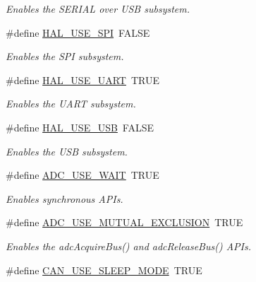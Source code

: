 \begin{DoxyCompactItemize}
\begin{DoxyCompactList}\small\item\em Enables the S\+E\+R\+I\+A\+L over U\+S\+B subsystem. \end{DoxyCompactList}\item 
\hypertarget{group__HAL__CONF_ga33a3c5bee9ed1f665aace8b88fed9b2b}{\#define \hyperlink{group__HAL__CONF_ga33a3c5bee9ed1f665aace8b88fed9b2b}{H\+A\+L\+\_\+\+U\+S\+E\+\_\+\+S\+P\+I}~F\+A\+L\+S\+E}\label{group__HAL__CONF_ga33a3c5bee9ed1f665aace8b88fed9b2b}

\begin{DoxyCompactList}\small\item\em Enables the S\+P\+I subsystem. \end{DoxyCompactList}\item 
\hypertarget{group__HAL__CONF_ga73220cad2edf2aee77b7ce1b53cacff0}{\#define \hyperlink{group__HAL__CONF_ga73220cad2edf2aee77b7ce1b53cacff0}{H\+A\+L\+\_\+\+U\+S\+E\+\_\+\+U\+A\+R\+T}~T\+R\+U\+E}\label{group__HAL__CONF_ga73220cad2edf2aee77b7ce1b53cacff0}

\begin{DoxyCompactList}\small\item\em Enables the U\+A\+R\+T subsystem. \end{DoxyCompactList}\item 
\hypertarget{group__HAL__CONF_gafc8f8fc6010f46f5baae4a369e14974e}{\#define \hyperlink{group__HAL__CONF_gafc8f8fc6010f46f5baae4a369e14974e}{H\+A\+L\+\_\+\+U\+S\+E\+\_\+\+U\+S\+B}~F\+A\+L\+S\+E}\label{group__HAL__CONF_gafc8f8fc6010f46f5baae4a369e14974e}

\begin{DoxyCompactList}\small\item\em Enables the U\+S\+B subsystem. \end{DoxyCompactList}\item 
\#define \hyperlink{group__HAL__CONF_ga39e892a4090185fbdda9bb105bc03b4f}{A\+D\+C\+\_\+\+U\+S\+E\+\_\+\+W\+A\+I\+T}~T\+R\+U\+E
\begin{DoxyCompactList}\small\item\em Enables synchronous A\+P\+Is. \end{DoxyCompactList}\item 
\#define \hyperlink{group__HAL__CONF_gac0893cb47e338c2dabad34b974a0a88d}{A\+D\+C\+\_\+\+U\+S\+E\+\_\+\+M\+U\+T\+U\+A\+L\+\_\+\+E\+X\+C\+L\+U\+S\+I\+O\+N}~T\+R\+U\+E
\begin{DoxyCompactList}\small\item\em Enables the {\ttfamily adc\+Acquire\+Bus()} and {\ttfamily adc\+Release\+Bus()} A\+P\+Is. \end{DoxyCompactList}\item 
\hypertarget{group__HAL__CONF_ga5294d9d12e4186c781df3b2f1d8bd80b}{\#define \hyperlink{group__HAL__CONF_ga5294d9d12e4186c781df3b2f1d8bd80b}{C\+A\+N\+\_\+\+U\+S\+E\+\_\+\+S\+L\+E\+E\+P\+\_\+\+M\+O\+D\+E}~T\+R\+U\+E}\label{group__HAL__CONF_ga5294d9d12e4186c781df3b2f1d8bd80b}


\end{DoxyCompactItemize}
